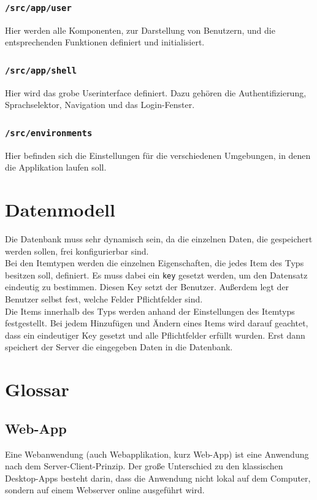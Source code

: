 \documentclass[11pt,a4paper]{report}
\begin{document}
	\subsubsection*{\texttt{/src/app/user}}
	Hier werden alle Komponenten, zur Darstellung von Benutzern, und die entsprechenden Funktionen definiert und initialisiert.
	
	\subsubsection*{\texttt{/src/app/shell}}
	Hier wird das grobe Userinterface definiert. Dazu gehören die Authentifizierung, Sprachselektor, Navigation und das Login-Fenster.
	
	\subsubsection*{\texttt{/src/environments}}
	Hier befinden sich die Einstellungen für die verschiedenen Umgebungen, in denen die Applikation laufen soll.
	
	\section{Datenmodell}
	Die Datenbank muss sehr dynamisch sein, da die einzelnen Daten, die gespeichert werden sollen, frei konfigurierbar sind.\\
	Bei den Itemtypen werden die einzelnen Eigenschaften, die jedes Item des Typs besitzen soll, definiert. 
	Es muss dabei ein \texttt{key} gesetzt werden, um den Datensatz eindeutig zu bestimmen. 
	Diesen Key setzt der Benutzer. 
	Außerdem legt der Benutzer selbst fest, welche Felder Pflichtfelder sind.\\
	Die Items innerhalb des Typs werden anhand der Einstellungen des Itemtyps festgestellt. 
	Bei jedem Hinzufügen und Ändern eines Items wird darauf geachtet, dass ein eindeutiger Key gesetzt und alle Pflichtfelder erfüllt wurden. 
	Erst dann speichert der Server die eingegeben Daten in die Datenbank.\\
	
	\newpage	
	
	\section{Glossar}
	
	\subsection*{Web-App}
	Eine Webanwendung (auch Webapplikation, kurz Web-App) ist eine Anwendung nach dem Server-Client-Prinzip. 
	Der große Unterschied zu den klassischen Desktop-Apps besteht darin, dass die Anwendung nicht lokal auf dem Computer, sondern auf einem Webserver online ausgeführt wird.
	
\end{document}

